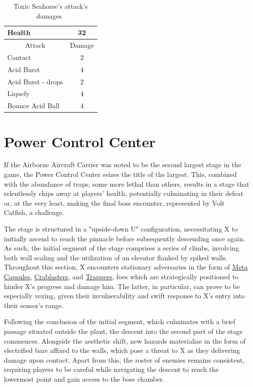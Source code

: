 \begin{table}[htp]
	\centering
	\begin{tabular}[h]{l c}
		\toprule
		Health  & 32\\
		\midrule
		\multicolumn{1}{c}{Attack} & \multicolumn{1}{c}{Damage}\\
		Contact & 2\\
		Acid Burst & 4\\
		Acid Burst - drops& 2\\
		Liquefy & 4\\
		Bounce Acid Ball& 4\\
		\bottomrule
	\end{tabular}
	\caption{Toxic Seahorse's attack's damages~\cite{wiki:Toxic_seahorse,book:Compendium}}
\end{table} 

\section{Power Control Center}
If the Airborne Aircraft Carrier was noted to be the second largest stage in the game, the Power Control Center seizes the title of the largest. This, combined with the abundance of traps, some more lethal than others, results in a stage that relentlessly chips away at players' health, potentially culminating in their defeat or, at the very least, making the final boss encounter, represented by Volt Catfish, a challenge.

The stage is structured in a "upside-down U" configuration, necessitating X to initially ascend to reach the pinnacle before subsequently descending once again. As such, the initial segment of the stage comprises a series of climbs, involving both wall scaling and the utilization of an elevator flanked by spiked walls. Throughout this section, X encounters stationary adversaries in the form of \hyperlink{enem:Meta_Capsule}{Meta Capsules}, \hyperlink{enem:Crablaster}{Crablasters}, and \hyperlink{enem:Trapper}{Trappers}, foes which are strategically positioned to hinder X's progress and damage him. The latter, in particular, can prove to be especially vexing, given their invulnerability and swift response to X's entry into their sensor's range.

Following the conclusion of the initial segment, which culminates with a brief passage situated outside the plant, the descent into the second part of the stage commences. Alongside the aesthetic  shift, new hazards materialize in the form of electrified bars affixed to the walls, which pose a threat to X as they delivering damage upon contact. Apart from this, the roster of enemies remains consistent, requiring players to be careful while navigating the descent to reach the lowermost point and gain access to the boss chamber.

